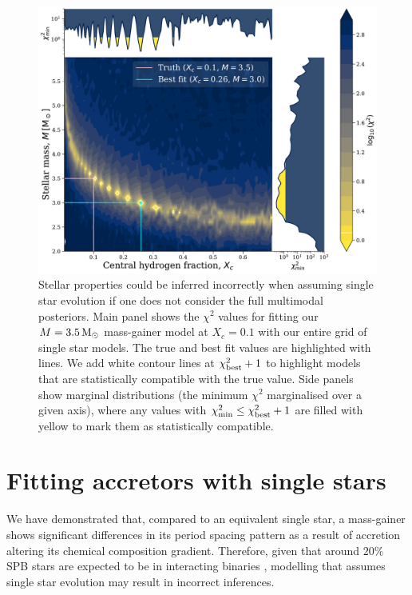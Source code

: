 \documentclass[desactivate]{aa}
\begin{document}
\begin{figure}[tb]
    \centering
    \includegraphics[width=\textwidth]{figures/chi2_xc_0.1.pdf}
    \caption{Stellar properties could be inferred incorrectly when assuming single star evolution if one does not consider the full multimodal posteriors. Main panel shows the $\chi^2$ values for fitting our $M = 3.5 \, {\rm M_\odot}$ mass-gainer model at $X_c = 0.1$ with our entire grid of single star models. The true and best fit values are highlighted with lines. We add white contour lines at $\chi^2_{\rm best} + 1$ to highlight models that are statistically compatible with the true value. Side panels show marginal distributions (the minimum $\chi^2$ marginalised over a given axis), where any values with $\chi^2_{\rm min} \le \chi^2_{\rm best} + 1$ are filled with yellow to mark them as statistically compatible.}
    \label{fig:chi2}
\end{figure}

\section{Fitting accretors with single stars} \label{sec:fitting}

We have demonstrated that, compared to an equivalent single star, a mass-gainer shows significant differences in its period spacing pattern as a result of accretion altering its chemical composition gradient. Therefore, given that around $20\%$ SPB stars are expected to be in interacting binaries \citep{Sana+2012,deMink+2014}, modelling that assumes single star evolution may result in incorrect inferences.
\end{document}
